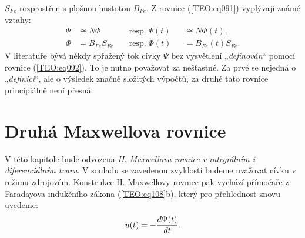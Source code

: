       \(S_{Fe}\) rozprostřen s plošnou hustotou \(B_{Fe}\). Z rovnice (\ref{TEO:eq091}) vyplývají
      známé vztahy:
      \begin{subequations}\label{TEO:eq092} 
        \begin{alignat}{3}
          \Psi & \cong  N\Phi   && \;\text{resp.}\; \Psi(t)&& \cong  N\Phi(t),  \label{TEO:eq092a}\\ 
          \Phi & =  B_{Fe}S_{Fe}&& \;\text{resp.}\; \Phi(t)&& = B_{Fe}(t)S_{Fe}.\label{TEO:eq092b}  
        \end{alignat}
      \end{subequations}
      V literatuře bývá někdy spřažený tok cívky \(\Psi\) bez vysvětlení „\emph{definován}“ pomocí
      rovnice (\ref{TEO:eq092}). To je nutno považovat za nešťastné. Za prvé se nejedná o
      „\emph{definici}“, ale o výsledek značně složitých výpočtů, za druhé tato rovnice principiálně
      není přesná.

    \section{Druhá Maxwellova rovnice}\label{ES:sec04}
    
      V této kapitole bude odvozena \emph{II. Maxwellova rovnice v integrálním i diferenciálním 
      tvaru}. V souladu se zavedenou zvyklostí budeme uvažovat cívku v režimu zdrojovém. Konstrukce 
      II. Maxwellovy rovnice pak vychází přímočaře z Faradayova indukčního zákona 
      (\ref{TEO:eq108}b), který pro přehlednost znovu uvedeme:
      \begin{equation}\label{TEO:eq111}
      u(t) = -\dfrac{d \Psi(t)}{d t}.
      \end{equation}
      
